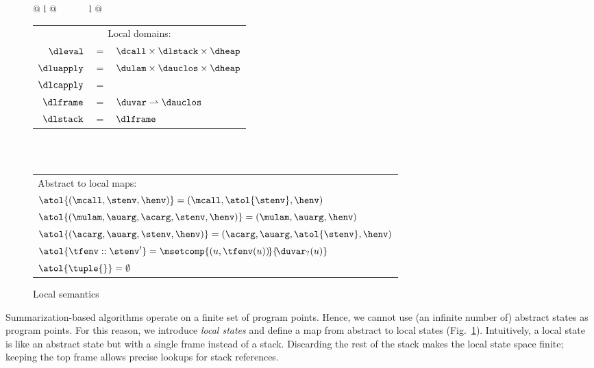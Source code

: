 \documentclass{LMCS}
\theoremstyle{definition} \newtheorem{property}[thm]{Property}
\begin{document}
\begin{figure}[!t]
{\begin{tabular}{@{} l @{$\qquad\quad$} l @{}}
{\begin{tabular}{@{} r @{\;\;} c @{\;} l @{}}
          \multicolumn{3}{c}{Local domains:\makebox[3cm][c]{}} 
          \rule{0cm}{0.8cm} \\
          $\dleval$ & $=$ & $\dcall \times \dlstack \times \dheap$ 
          \rule{0cm}{0.42cm}\\
          $\dluapply$ & $=$ & $\dulam \times \dauclos \times \dheap$
          \rule{0cm}{0.42cm}\\
          $\dlcapply$ & $=$ & 
          \lbox{
            $\dacclos \times \dauclos \times \dlstack \times$ 
            $ \dheap$}
          \rule{0cm}{0.42cm}\\
          $\dlframe$ & $=$ & $\duvar \rightharpoonup \dauclos$
          \rule{0cm}{0.42cm}\\
          $\dlstack$ & $=$ & $\dlframe$
          \rule{0cm}{0.42cm} 
        \end{tabular}
        \\ \\
        \begin{tabular}{@{$\quad$} l @{}}
          Abstract to local maps: \rule{0cm}{0.6cm} \\
          $\atol{(\mcall, \stenv, \henv)} = (\mcall, \atol{\stenv}, \henv)$ 
          \rule{0cm}{0.42cm}\\
          $\atol{(\mulam, \auarg, \acarg, \stenv, \henv)} = (\mulam, \auarg, \henv)$
          \rule{0cm}{0.42cm}\\
          $\atol{(\acarg, \auarg, \stenv, \henv)} = (\acarg, \auarg, \atol{\stenv}, \henv)$
          \rule{0cm}{0.42cm} \\
          $\atol{\tfenv::\stenv'} = \msetcomp{(u, \tfenv(u)) \!}{\!\duvar_?(u)}$ 
          \rule{0cm}{0.42cm}\\
          $\atol{\tuple{}} = \emptyset$ 
          \rule{0cm}{0.42cm}
        \end{tabular}
      }
    \end{tabular}
  }
  \caption{Local semantics \label{fig:localsems}}
\end{figure}

Summarization-based algorithms operate on a finite set of program points.
Hence, we cannot use (an infinite number of) abstract states as program points.
For this reason, we introduce \emph{local states} and define 
a map \atol{\cdot} from abstract to local states (Fig.~\ref{fig:localsems}).
Intuitively, a local state is like an abstract state but with a single frame
instead of a stack.
Discarding the rest of the stack makes the local state space finite;
keeping the top frame allows precise lookups for stack references.
\end{document}
